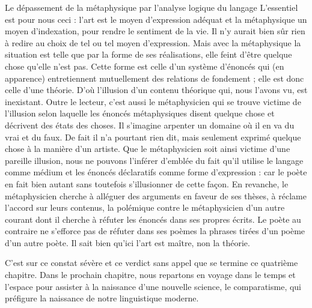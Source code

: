 \begin{bbcomplement}{Le dépassement de la métaphysique par l’analyse logique du langage}
L’essentiel est pour nous ceci : l’art est le moyen d’expression adéquat et la métaphysique un moyen d’indexation, pour rendre le sentiment de la vie. Il n’y aurait bien sûr rien à redire au choix de tel ou tel moyen d’expression. Mais avec la métaphysique la situation est telle que par la forme de ses réalisations, elle feint d’être quelque chose qu’elle n’est pas. Cette forme est celle d’un système d’énoncés qui (en apparence) entretiennent mutuellement des relations de fondement ; elle est donc celle d’une théorie. D’où l’illusion d’un contenu théorique qui, nous l’avons vu, est inexistant. Outre le lecteur, c’est aussi le métaphysicien qui se trouve victime de l’illusion selon laquelle les énoncés métaphysiques disent quelque chose et décrivent des états des choses. Il s’imagine arpenter un domaine où il en va du vrai et du faux. De fait il n’a pourtant rien dit, mais seulement exprimé quelque chose à la manière d’un artiste. Que le métaphysicien soit ainsi victime d’une pareille illusion, nous ne pouvons l’inférer d’emblée du fait qu’il utilise le langage comme médium et les énoncés déclaratifs comme forme d’expression : car le poète en fait bien autant sans toutefois s’illusionner de cette façon. En revanche, le métaphysicien cherche à alléguer des arguments en faveur de ses thèses, à réclame l’accord sur leurs contenus, la polémique contre le métaphysicien d’un autre courant dont il cherche à réfuter les énoncés dans ses propres écrits. Le poète au contraire ne s’efforce pas de réfuter dans ses poèmes la phrases tirées d’un poème d’un autre poète. Il sait bien qu’ici l’art est maître, non la théorie.
\end{bbcomplement}

C’est sur ce constat sévère et ce verdict sans appel que se termine ce quatrième chapitre. Dans le prochain chapitre, nous repartons en voyage dans le temps et l’espace pour assister à la naissance d’une nouvelle science, le comparatisme, qui préfigure la naissance de notre linguistique moderne.

